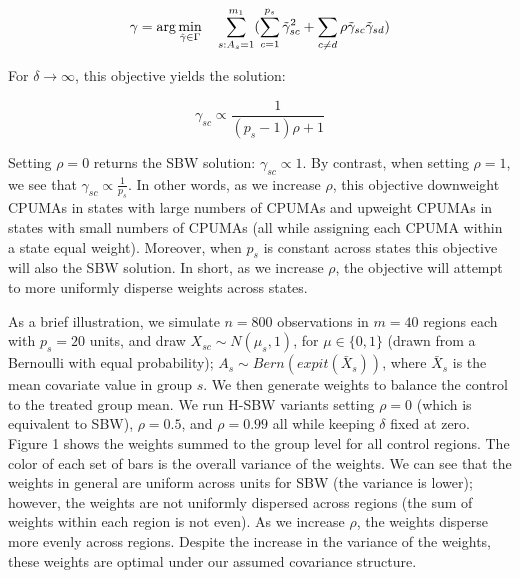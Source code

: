 \documentclass[article]{imsart}
\theoremstyle{plain}
\theoremstyle{remark}
\begin{document}
\begin{equation}\label{eqn:objective}
\gamma = \arg\min_{\tilde{\gamma} \in \Gamma} \quad \sum_{s: A_s = 1}^{m_1}(\sum_{c = 1}^{p_s} \tilde{\gamma}_{sc}^2 + \sum_{c \ne d}\rho \tilde{\gamma}_{sc}\tilde{\gamma}_{sd})\\
\end{equation}

For $\delta \to \infty$, this objective yields the solution:

\begin{equation}\label{eqn:sbwsol}
\gamma_{sc} \propto \frac{1}{(p_s - 1)\rho + 1}
\end{equation}

Setting $\rho = 0$ returns the SBW solution: $\gamma_{sc} \propto 1$. By contrast, when setting $\rho = 1$, we see that $\gamma_{sc} \propto \frac{1}{p_s}$. In other words, as we increase $\rho$, this objective downweight CPUMAs in states with large numbers of CPUMAs and upweight CPUMAs in states with small numbers of CPUMAs (all while assigning each CPUMA within a state equal weight). Moreover, when $p_s$ is constant across states this objective will also the SBW solution. In short, as we increase $\rho$, the objective will attempt to more uniformly disperse weights across states.

As a brief illustration, we simulate $n = 800$ observations in $m = 40$ regions each with $p_s = 20$ units, and draw $X_{sc} \sim N(\mu_s, 1)$, for $\mu \in \{0, 1\}$ (drawn from a Bernoulli with equal probability); $A_s \sim Bern(expit(\bar{X}_s))$, where $\bar{X}_s$ is the mean covariate value in group $s$. We then generate weights to balance the control to the treated group mean. We run H-SBW variants setting $\rho = 0$ (which is equivalent to SBW), $\rho = 0.5$, and $\rho = 0.99$ all while keeping $\delta$ fixed at zero. Figure 1 shows the weights summed to the group level for all control regions. The color of each set of bars is the overall variance of the weights. We can see that the weights in general are uniform across units for SBW (the variance is lower); however, the weights are not uniformly dispersed across regions (the sum of weights within each region is not even). As we increase $\rho$, the weights disperse more evenly across regions. Despite the increase in the variance of the weights, these weights are optimal under our assumed covariance structure. 
\end{document}
